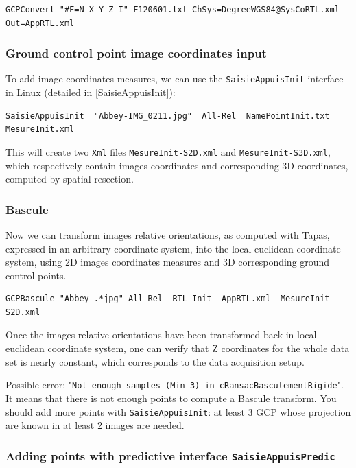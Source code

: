 \begin{verbatim}
GCPConvert "#F=N_X_Y_Z_I" F120601.txt ChSys=DegreeWGS84@SysCoRTL.xml Out=AppRTL.xml
\end{verbatim}

\subsubsection{Ground control point image coordinates input}

To add image coordinates measures, we can use the {\tt SaisieAppuisInit} interface in Linux (detailed in \ref{SaisieAppuisInit}):

\begin{verbatim}
SaisieAppuisInit  "Abbey-IMG_0211.jpg"  All-Rel  NamePointInit.txt  MesureInit.xml
\end{verbatim}

This will create two {\tt Xml} files {\tt MesureInit-S2D.xml} and {\tt MesureInit-S3D.xml}, which respectively contain images coordinates and corresponding 3D coordinates, computed by spatial resection.

\subsubsection{Bascule}

Now we can transform images relative orientations, as computed with Tapas, expressed in an arbitrary coordinate system,
into the local euclidean coordinate system, using 2D images coordinates measures and 3D corresponding ground control points. 

\begin{verbatim}
GCPBascule "Abbey-.*jpg" All-Rel  RTL-Init  AppRTL.xml  MesureInit-S2D.xml 
\end{verbatim}

Once the images relative orientations have been transformed back in local euclidean coordinate system, one can verify that Z coordinates for the whole data set is nearly constant, which corresponds to the data acquisition setup.

\vspace{\baselineskip}
Possible error: "{\tt Not enough samples (Min 3) in cRansacBasculementRigide}". It means that there is not enough points to compute a Bascule transform. You should add more points with {\tt SaisieAppuisInit}:
at least 3 GCP whose projection are known in at least 2 images are needed.

\subsubsection{Adding points with predictive interface {\tt SaisieAppuisPredic}}

